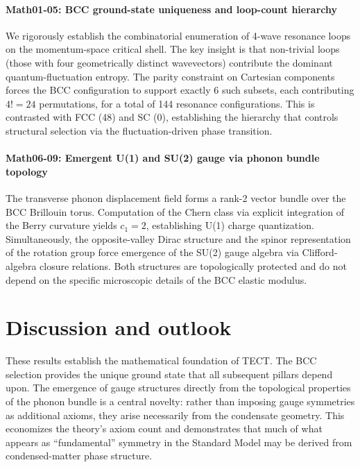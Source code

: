 \paragraph{Math01-05: BCC ground-state uniqueness and loop-count hierarchy}
We rigorously establish the combinatorial enumeration of 4-wave resonance loops on the
momentum-space critical shell. The key insight is that non-trivial loops (those with four
geometrically distinct wavevectors) contribute the dominant quantum-fluctuation entropy.
The parity constraint on Cartesian components forces the BCC configuration to support
exactly 6 such subsets, each contributing $4! = 24$ permutations, for a total of 144 resonance
configurations. This is contrasted with FCC (48) and SC (0), establishing the hierarchy
that controls structural selection via the fluctuation-driven phase transition.
\cite{Math01, Math02, Math03, Math04, Math05}

\paragraph{Math06-09: Emergent U(1) and SU(2) gauge via phonon bundle topology}
The transverse phonon displacement field forms a rank-2 vector bundle over the BCC Brillouin
torus. Computation of the Chern class via explicit integration of the Berry curvature yields
$c_1 = 2$, establishing U(1) charge quantization. Simultaneously, the opposite-valley Dirac
structure and the spinor representation of the rotation group force emergence of the SU(2)
gauge algebra via Clifford-algebra closure relations. Both structures are topologically protected
and do not depend on the specific microscopic details of the BCC elastic modulus. \cite{Math06,
Math07, Math08, Math09}

\section{Discussion and outlook}
These results establish the mathematical foundation of TECT. The BCC selection provides
the unique ground state that all subsequent pillars depend upon. The emergence of gauge
structures directly from the topological properties of the phonon bundle is a central
novelty: rather than imposing gauge symmetries as additional axioms, they arise necessarily
from the condensate geometry. This economizes the theory's axiom count and demonstrates
that much of what appears as ``fundamental'' symmetry in the Standard Model may be derived
from condensed-matter phase structure.

